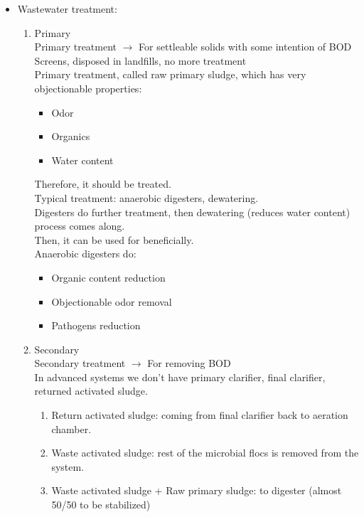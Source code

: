\documentclass{article}
\numberwithin{equation}{section}
\begin{document}
\begin{itemize}
    \item Wastewater treatment:
    \begin{enumerate}
        \item Primary\\
        Primary treatment $\rightarrow$ For settleable solids with some intention of BOD\\
        Screens, disposed in landfills, no more treatment\\
        Primary treatment, called raw primary sludge, which has very objectionable properties:
        \begin{itemize}
            \item Odor
            \item Organics
            \item Water content
            \end{itemize}
            Therefore, it should be treated.\\
            Typical treatment: anaerobic digesters, dewatering.\\
            Digesters do further treatment, then dewatering (reduces water content) process comes along.\\
            Then, it can be used for beneficially.\\
            Anaerobic digesters do:\begin{itemize}
                \item Organic content reduction
                \item Objectionable odor removal
                \item Pathogens reduction
            \end{itemize}
        \item Secondary\\
        Secondary treatment $\rightarrow$ For removing BOD\\
        In advanced systems we don't have primary clarifier, final clarifier, returned activated sludge.\begin{enumerate}
            \item Return activated sludge: coming from final clarifier back to aeration chamber.
            \item Waste activated sludge: rest of the microbial flocs is removed from the system.
            \item Waste activated sludge + Raw primary sludge: to digester (almost 50/50 to be stabilized)
        \end{enumerate}

\end{enumerate}
\end{itemize}
\end{document}
